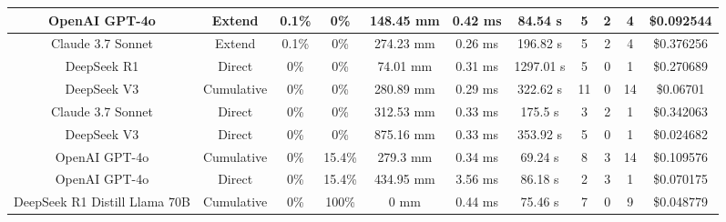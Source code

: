 \begin{landscape}
\begin{table}[H]
\begin{center}
\begin{tabular}{|c|c|c|c|c|c|c|c|c|c|c|}
    \hline
    OpenAI GPT-4o & Extend & 0.1\% & 0\% & 148.45 mm & 0.42 ms & 84.54 s & 5 & 2 & 4 & \$0.092544 \\
    \hline
    Claude 3.7 Sonnet & Extend & 0.1\% & 0\% & 274.23 mm & 0.26 ms & 196.82 s & 5 & 2 & 4 & \$0.376256 \\
    \hline
    DeepSeek R1 & Direct & 0\% & 0\% & 74.01 mm & 0.31 ms & 1297.01 s & 5 & 0 & 1 & \$0.270689 \\
    \hline
    DeepSeek V3 & Cumulative & 0\% & 0\% & 280.89 mm & 0.29 ms & 322.62 s & 11 & 0 & 14 & \$0.06701 \\
    \hline
    Claude 3.7 Sonnet & Direct & 0\% & 0\% & 312.53 mm & 0.33 ms & 175.5 s & 3 & 2 & 1 & \$0.342063 \\
    \hline
    DeepSeek V3 & Direct & 0\% & 0\% & 875.16 mm & 0.33 ms & 353.92 s & 5 & 0 & 1 & \$0.024682 \\
    \hline
    OpenAI GPT-4o & Cumulative & 0\% & 15.4\% & 279.3 mm & 0.34 ms & 69.24 s & 8 & 3 & 14 & \$0.109576 \\
    \hline
    OpenAI GPT-4o & Direct & 0\% & 15.4\% & 434.95 mm & 3.56 ms & 86.18 s & 2 & 3 & 1 & \$0.070175 \\
    \hline
    DeepSeek R1 Distill Llama 70B & Cumulative & 0\% & 100\% & 0 mm & 0.44 ms & 75.46 s & 7 & 0 & 9 & \$0.048779 \\
    \hline
\end{tabular}
\label{Results-Position-2-5}
\end{center}
\end{table}


\end{landscape}
